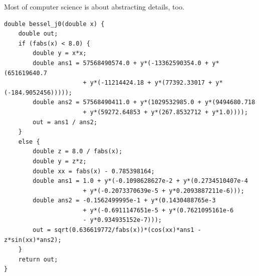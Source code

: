 \documentclass[aspectratio=169]{beamer}
\begin{document}
\begin{frame}[fragile]{Most of computer science is about abstracting details, too.}
\scriptsize
\vspace{0.05 cm}
\begin{verbatim}
double bessel_j0(double x) {
    double out;
    if (fabs(x) < 8.0) {
        double y = x*x;
        double ans1 = 57568490574.0 + y*(-13362590354.0 + y*(651619640.7
                      + y*(-11214424.18 + y*(77392.33017 + y*(-184.9052456)))));
        double ans2 = 57568490411.0 + y*(1029532985.0 + y*(9494680.718
                      + y*(59272.64853 + y*(267.8532712 + y*1.0))));
        out = ans1 / ans2;
    }
    else {
        double z = 8.0 / fabs(x);
        double y = z*z;
        double xx = fabs(x) - 0.785398164;
        double ans1 = 1.0 + y*(-0.1098628627e-2 + y*(0.2734510407e-4
                      + y*(-0.2073370639e-5 + y*0.2093887211e-6)));
        double ans2 = -0.1562499995e-1 + y*(0.1430488765e-3
                      + y*(-0.6911147651e-5 + y*(0.7621095161e-6
                      - y*0.934935152e-7)));
        out = sqrt(0.636619772/fabs(x))*(cos(xx)*ans1 - z*sin(xx)*ans2);
    }
    return out;
}
\end{verbatim}

\vspace{-7.95 cm}

\vspace{6.4 cm}

\end{frame}
\end{document}

